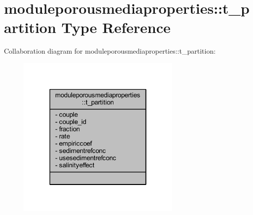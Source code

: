\hypertarget{structmoduleporousmediaproperties_1_1t__partition}{}\section{moduleporousmediaproperties\+:\+:t\+\_\+partition Type Reference}
\label{structmoduleporousmediaproperties_1_1t__partition}


Collaboration diagram for moduleporousmediaproperties\+:\+:t\+\_\+partition\+:\nopagebreak
\begin{figure}[H]
\begin{center}
\leavevmode
\includegraphics[width=226pt]{structmoduleporousmediaproperties_1_1t__partition__coll__graph}
\end{center}
\end{figure}
